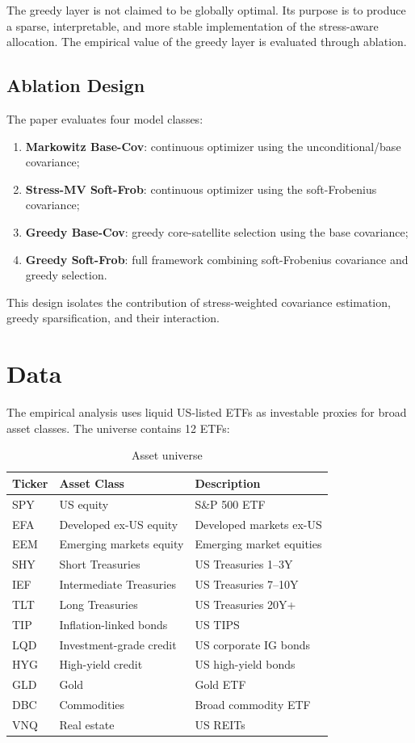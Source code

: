 \documentclass[11pt]{article}
\begin{document}
The greedy layer is not claimed to be globally optimal. Its purpose is to produce a sparse, interpretable, and more stable implementation of the stress-aware allocation. The empirical value of the greedy layer is evaluated through ablation.

\subsection{Ablation Design}

The paper evaluates four model classes:
\begin{enumerate}[label=(\roman*)]
    \item \textbf{Markowitz Base-Cov}: continuous optimizer using the unconditional/base covariance;
    \item \textbf{Stress-MV Soft-Frob}: continuous optimizer using the soft-Frobenius covariance;
    \item \textbf{Greedy Base-Cov}: greedy core-satellite selection using the base covariance;
    \item \textbf{Greedy Soft-Frob}: full framework combining soft-Frobenius covariance and greedy selection.
\end{enumerate}

This design isolates the contribution of stress-weighted covariance estimation, greedy sparsification, and their interaction.

\section{Data}
\label{sec:data}

The empirical analysis uses liquid US-listed ETFs as investable proxies for broad asset classes. The universe contains 12 ETFs:

\begin{table}[h!]
\centering
\caption{Asset universe}
\begin{tabular}{lll}
\toprule
Ticker & Asset Class & Description \\
\midrule
SPY & US equity & S\&P 500 ETF \\
EFA & Developed ex-US equity & Developed markets ex-US \\
EEM & Emerging markets equity & Emerging market equities \\
SHY & Short Treasuries & US Treasuries 1--3Y \\
IEF & Intermediate Treasuries & US Treasuries 7--10Y \\
TLT & Long Treasuries & US Treasuries 20Y+ \\
TIP & Inflation-linked bonds & US TIPS \\
LQD & Investment-grade credit & US corporate IG bonds \\
HYG & High-yield credit & US high-yield bonds \\
GLD & Gold & Gold ETF \\
DBC & Commodities & Broad commodity ETF \\
VNQ & Real estate & US REITs \\
\bottomrule
\end{tabular}
\end{table}
\end{document}
